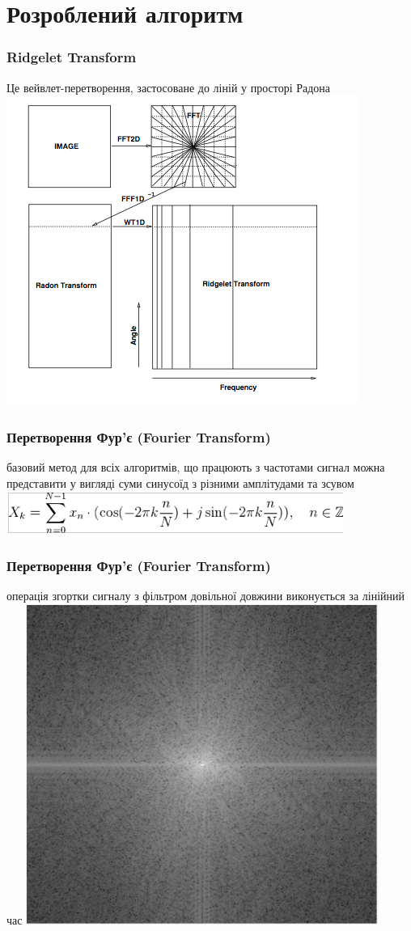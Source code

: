 \documentclass[12pt]{beamer}
\begin{document}
\section{Розроблений алгоритм}
\begin{frame}\frametitle{Ridgelet Transform }
	Це вейвлет-перетворення, застосоване до ліній у просторі Радона
	\includegraphics[scale=0.3]{images/ridgelet}	 
\end{frame}
\begin{frame}\frametitle{Перетворення Фур'є (Fourier Transform)  }
	базовий метод для всіх алгоритмів, що працюють з частотами \linebreak \linebreak  
	сигнал можна представити у вигляді суми синусоїд з різними амплітудами та зсувом
	\includegraphics[scale=0.5]{images/fourier_1d} 
\end{frame}

\begin{frame}\frametitle{Перетворення Фур'є (Fourier Transform)  }
		операція згортки сигналу з фільтром довільної довжини виконується за лінійний час
		\includegraphics[scale=0.35]{images/fft_2d} 
\end{frame}
\end{document}
